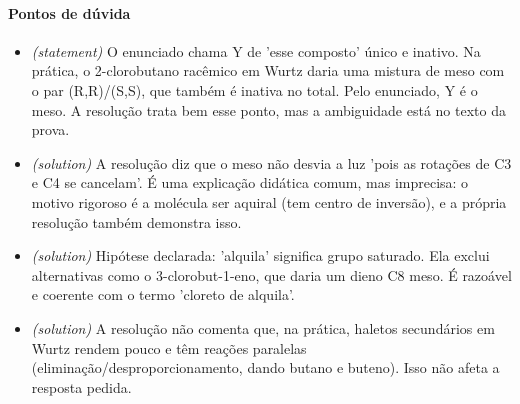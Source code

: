 \documentclass{article}%
\begin{document}
\paragraph{Pontos de dúvida}%
\begin{itemize}%
\item%
\textit{(statement)} O enunciado chama Y de 'esse composto' único e inativo. Na prática, o 2{-}clorobutano racêmico em Wurtz daria uma mistura de meso com o par (R,R)/(S,S), que também é inativa no total. Pelo enunciado, Y é o meso. A resolução trata bem esse ponto, mas a ambiguidade está no texto da prova.%
\item%
\textit{(solution)} A resolução diz que o meso não desvia a luz 'pois as rotações de C3 e C4 se cancelam'. É uma explicação didática comum, mas imprecisa: o motivo rigoroso é a molécula ser aquiral (tem centro de inversão), e a própria resolução também demonstra isso.%
\item%
\textit{(solution)} Hipótese declarada: 'alquila' significa grupo saturado. Ela exclui alternativas como o 3{-}clorobut{-}1{-}eno, que daria um dieno C8 meso. É razoável e coerente com o termo 'cloreto de alquila'.%
\item%
\textit{(solution)} A resolução não comenta que, na prática, haletos secundários em Wurtz rendem pouco e têm reações paralelas (eliminação/desproporcionamento, dando butano e buteno). Isso não afeta a resposta pedida.%
\end{itemize}%
\end{document}

